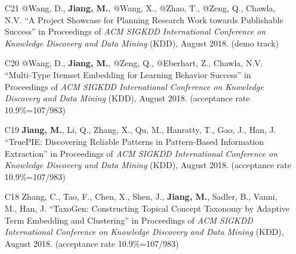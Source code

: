 \documentclass[10pt]{article}
\newenvironment{myindentpar}[1]%
{\begin{list}{}%
         {\setlength{\leftmargin}{#1}}%
         \item[]%
}
{\end{list}}
\newcounter{list}
\newcommand{\hide}[1]{}
\begin{document}
\begin{myindentpar}{0.00cm}
\begin{enumerate}[leftmargin=.5cm]
	\hide{\vspace{-0.1cm}\hspace{0.5cm}{\small \emph{I made 20\% contribution. Mr. Zhao conceived the idea in consultation with myself. Mr. Zhao implemented the system, completed the experiments, and wrote the paper.}}}

\item[C21] @Wang, D., \textbf{Jiang, M.}, @Wang, X., @Zhao, T., @Zeng, Q., Chawla, N.V. ``A Project Showcase for Planning Research Work towards Publishable Success'' in Proceedings of \emph{ACM SIGKDD International Conference on Knowledge Discovery and Data Mining} (KDD), August 2018. (demo track)

	\hide{\vspace{-0.1cm}\hspace{0.5cm}{\small \emph{I made 20\% contribution. I conceived the idea. Mr. Wang implemented the system, did the experiments, and wrote the paper.}}}

\item[C20] @Wang, D., \textbf{Jiang, M.}, @Zeng, Q., @Eberhart, Z., Chawla, N.V. ``Multi-Type Itemset Embedding for Learning Behavior Success'' in Proceedings of \emph{ACM SIGKDD International Conference on Knowledge Discovery and Data Mining} (KDD), August 2018. (acceptance rate 10.9\%=107/983)

	\hide{\vspace{-0.1cm}\hspace{0.5cm}{\small \emph{I made 70\% contribution and Mr. Wang made 20\%. I conceived the idea and designed the study. Mr. Wang implemented the system and did the experiments.}}}

\item[C19] \textbf{Jiang, M.}, Li, Q., Zhang, X., Qu, M., Hanratty, T., Gao, J., Han, J. ``TruePIE: Discovering Reliable Patterns in Pattern-Based Information Extraction'' in Proceedings of \emph{ACM SIGKDD International Conference on Knowledge Discovery and Data Mining} (KDD), August 2018. (acceptance rate 10.9\%=107/983)

	\hide{\vspace{-0.1cm}\hspace{0.5cm}{\small \emph{I made 40\% contribution and Dr. Li made 40\%. Dr. Li and I are co-first authors. I conceived the idea. Dr. Li did the experiments, and wrote the paper.}}}

\item[C18] Zhang, C., Tao, F., Chen, X., Shen, J., \textbf{Jiang, M.}, Sadler, B., Vanni, M., Han, J. ``TaxoGen: Constructing Topical Concept Taxonomy by Adaptive Term Embedding and Clustering'' in Proceedings of \emph{ACM SIGKDD International Conference on Knowledge Discovery and Data Mining} (KDD), August 2018. (acceptance rate 10.9\%=107/983)


\end{enumerate}
\end{myindentpar}
\end{document}
